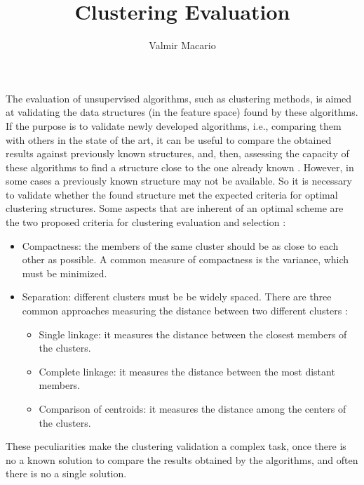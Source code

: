 \title{Clustering Evaluation}
\label{chp:evaluation-unsupervised-learning}
\author{Valmir Macario}
\maketitle
 
The evaluation of unsupervised algorithms, such as clustering methods, is aimed at validating the data structures (in the feature space) found by these algorithms. If the purpose is to validate newly developed algorithms, i.e., comparing them with others in the state of the art, it can be useful to compare the obtained results against previously known structures, and, then, assessing the capacity of these algorithms to find a structure close to the one already known \cite{carvalho2011inteligencia}. However, in some cases a previously known structure may not be available. So it is necessary to validate whether the found structure met the expected criteria for optimal clustering structures. Some aspects that are inherent of an optimal scheme are the two proposed criteria for clustering evaluation and selection \cite{Berry1996}:
\begin{itemize}
\item Compactness: the members of the same cluster should be as close to each other as possible. A common measure of compactness is the variance, which must be minimized.

\item Separation: different clusters must be be widely spaced. There are three common approaches measuring the distance between two different clusters \cite{halkidi2001clustering}:
\begin{itemize}
    
\item Single linkage: it measures the distance between the closest members of the clusters.
\item Complete linkage: it measures the distance between the most distant members.
\item Comparison of centroids: it measures the distance among the centers of the clusters.
\end{itemize}
\end{itemize}

These peculiarities make the clustering validation a complex task, once there is no a known solution to compare the results obtained by the algorithms, and often there is no a single solution. 

